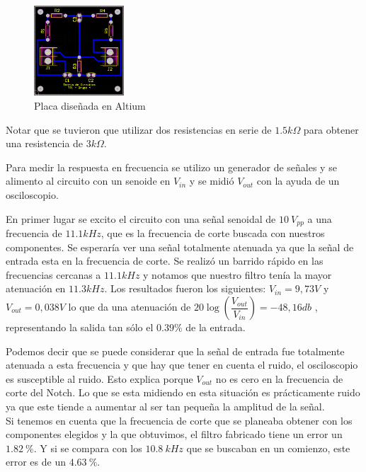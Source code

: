 \begin{figure}[H]                                                       
    \centering\includegraphics[width=0.3\textwidth]{resources/placa_altium.png}
    \caption{Placa diseñada en Altium}
    \label{fig:placa_altium}
    \end{figure}

Notar que se tuvieron que utilizar dos resistencias en serie de $1.5k\Omega$ para obtener una
resistencia de $3k\Omega$. 

Para medir la respuesta en frecuencia se utilizo un generador de señales y se alimento al circuito con un senoide en $V_{in}$ y se midió $V_{out}$ con la ayuda de un osciloscopio.

En primer lugar se excito el circuito con una señal senoidal de $10 \ V_{pp}$ a una frecuencia de $11.1kHz$, que es la frecuencia de corte buscada con nuestros componentes. Se esperaría ver una señal totalmente atenuada ya que la señal de entrada esta en la frecuencia de corte. Se realizó un barrido rápido en las frecuencias cercanas a $11.1kHz$ y notamos que nuestro filtro tenía la mayor atenuación en $11.3kHz$. Los resultados fueron los siguientes: $V_{in}=9,73V$ y $V_{out}= 0,038V$ lo que da una atenuación de $20\log(\dfrac{V_{out}}{V_{in}}) = -48,16db$ , representando la salida tan sólo el $0.39 \%$ de la entrada. 

Podemos decir que se puede considerar que la señal de entrada fue totalmente atenuada a esta frecuencia y que
hay que tener en cuenta el ruido, el 
osciloscopio es susceptible al ruido. Esto explica porque $V_{out}$ no es cero en la frecuencia de corte del Notch. Lo que se esta midiendo en esta situación es prácticamente ruido ya que este tiende a aumentar al ser tan pequeña la amplitud de la señal. \\

Si tenemos en cuenta que la frecuencia de corte que se planeaba obtener con los componentes elegidos y la que obtuvimos, el filtro fabricado tiene un error un $1.82 \ \%$. Y si se compara con los $10.8 \ kHz$ que se buscaban en un comienzo, este error es de un $4.63 \ \%$.


